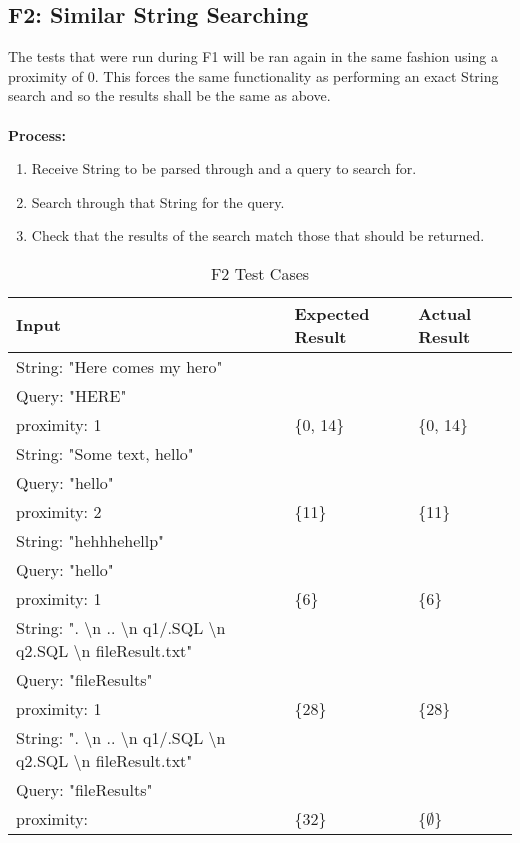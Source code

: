 \documentclass[12pt, titlepage]{article}
\begin{document}
\subsection{F2: Similar String Searching}
The tests that were run during F1 will be ran again in the same fashion using a proximity of 0. This forces the same functionality as performing an exact String search and so the results shall be the same as above.\\\\
\textbf{Process:}
\begin{enumerate}
\item{Receive String to be parsed through and a query to search for.}
\item{Search through that String for the query.}
\item{Check that the results of the search match those that should be returned.}
\end{enumerate}
\begin{table}[h!]
\centering
\begin{tabular}{ p{7cm}  p{4cm}  p{4cm} }
	Input &Expected Result &Actual Result\\ \hline
	String: "Here comes my hero"\\
	Query: "HERE"\\
	proximity: 1 & \{0, 14\} & \{0, 14\}\\ \hline
	String: "Some text, hello"\\
	Query: "hello"\\
	proximity: 2 & \{11\} & \{11\}\\ \hline
	String: "hehhhehellp"\\
	Query: "hello"\\
	proximity: 1 & \{6\} & \{6\}\\ \hline
	String: ". \textbackslash n .. \textbackslash n q1/.SQL \textbackslash n q2.SQL \textbackslash n fileResult.txt"\\
	Query: "fileResults"\\
	proximity: 1 & \{28\} & \{28\}\\ \hline
	String: ". \textbackslash n .. \textbackslash n q1/.SQL \textbackslash n q2.SQL \textbackslash n fileResult.txt"\\
	Query: "fileResults"\\
	proximity: & \{32\} & \{$\emptyset$\}\\ \hline
\end{tabular}
\caption{F2 Test Cases}
\label{table:F2 Test Cases}
\end{table}
\end{document}
